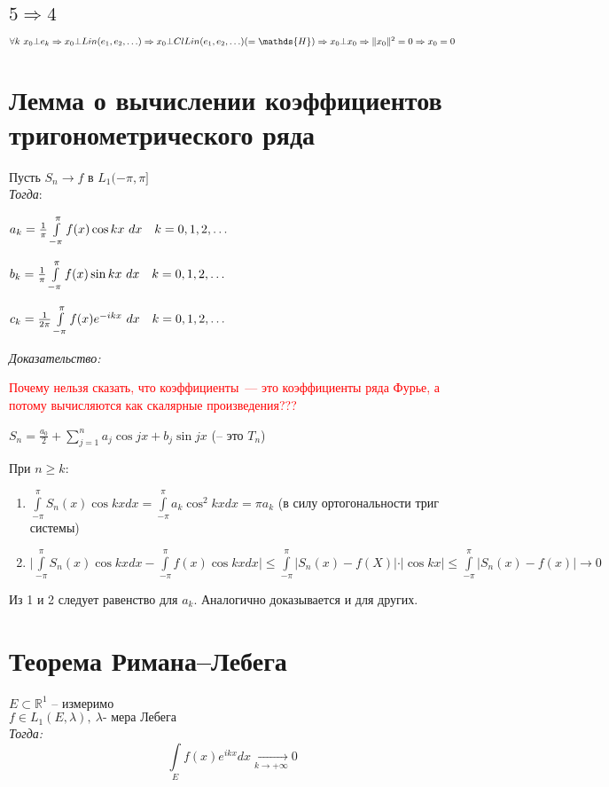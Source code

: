 \documentclass[paper=a4, fontsize=17pt]{article}
\begin{document}
\subsection{\texorpdfstring{$5 \Rightarrow 4$}{TEXT}}
$\forall k \ x_0 \bot e_k \Rightarrow x_0 \bot Lin(e_1, e_2, \mathellipsis) \Rightarrow x_0 \bot Cl Lin(e_1, e_2, \mathellipsis)( = \mathds{H}) \Rightarrow x_0 \bot x_0 \Rightarrow \|x_0\|^2 = 0 \Rightarrow x_0 = 0$

\section{Лемма о вычислении коэффициентов тригонометрического ряда}

Пусть $S_n \rightarrow f$ в $L_1(-\pi, \pi]$\\

\emph{Тогда}:

$a_k = \frac{1}{\pi}\int\limits_{-\pi}^{\pi}f(x)\cos kx\ dx \quad k = 0, 1, 2, \mathellipsis$

$b_k = \frac{1}{\pi}\int\limits_{-\pi}^{\pi}f(x)\sin kx\ dx \quad k = 0, 1, 2, \mathellipsis$

$c_k = \frac{1}{2\pi}\int\limits_{-\pi}^{\pi}f(x)e^{-ikx}\ dx \quad k = 0, 1, 2, \mathellipsis$


\emph{Доказательство:}

\textcolor{red}{Почему нельзя сказать, что коэффициенты~--- это коэффициенты ряда Фурье, а потому вычисляются как скалярные произведения???}

$S_n=\frac{a_0}2 + \sum\limits_{j=1}^n a_j \cos jx + b_j \sin jx$ (-- это $T_n$)

При $n \ge k:$

\begin{enumerate}
	\item
		$\int\limits_{-\pi}^{\pi} S_n(x) \cos kx dx = \int\limits_{-\pi}^{\pi} a_k \cos^2 kx dx = \pi a_k$
		(в силу ортогональности триг системы)
	\item
		$\vert \int\limits_{-\pi}^{\pi} S_n(x) \cos kx dx - \int\limits_{-\pi}^{\pi} f(x) \cos kx dx \vert \le \int\limits_{-\pi}^{\pi} \vert S_n(x)-f(X) \vert \cdot \vert \cos kx \vert \le \int\limits_{-\pi}^{\pi} \vert S_n(x) - f(x) \vert \rightarrow 0$
\end{enumerate}

Из 1 и 2 следует равенство для $a_k$. Аналогично доказывается и для других.

\section{Теорема Римана--Лебега}
$E \subset \mathds{R}^1$ -- измеримо\\ $f \in L_1(E, \lambda), ~ \lambda \text{- мера Лебега}$ \\
\emph{Тогда:}
$$\int\limits_{E}f(x)e^{ikx}dx \xrightarrow[k \to +\infty]{} 0$$
\end{document}
